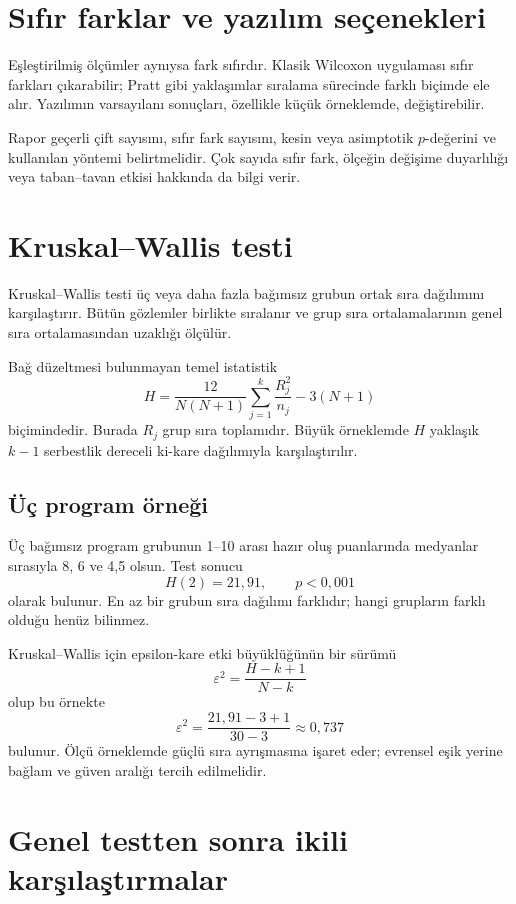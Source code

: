 \section{Sıfır farklar ve yazılım seçenekleri}

Eşleştirilmiş ölçümler aynıysa fark sıfırdır. Klasik Wilcoxon uygulaması sıfır
farkları çıkarabilir; Pratt gibi yaklaşımlar sıralama sürecinde farklı biçimde
ele alır. Yazılımın varsayılanı sonuçları, özellikle küçük örneklemde,
değiştirebilir.

Rapor geçerli çift sayısını, sıfır fark sayısını, kesin veya asimptotik
$p$-değerini ve kullanılan yöntemi belirtmelidir. Çok sayıda sıfır fark,
ölçeğin değişime duyarlılığı veya taban--tavan etkisi hakkında da bilgi verir.

\section{Kruskal--Wallis testi}

Kruskal--Wallis testi üç veya daha fazla bağımsız grubun ortak sıra
dağılımını karşılaştırır. Bütün gözlemler birlikte sıralanır ve grup sıra
ortalamalarının genel sıra ortalamasından uzaklığı ölçülür.

Bağ düzeltmesi bulunmayan temel istatistik
\[
H=\frac{12}{N(N+1)}
\sum_{j=1}^k\frac{R_j^2}{n_j}-3(N+1)
\]
biçimindedir. Burada $R_j$ grup sıra toplamıdır. Büyük örneklemde $H$ yaklaşık
$k-1$ serbestlik dereceli ki-kare dağılımıyla karşılaştırılır.

\subsection{Üç program örneği}

Üç bağımsız program grubunun 1--10 arası hazır oluş puanlarında medyanlar
sırasıyla 8, 6 ve 4,5 olsun. Test sonucu
\[
H(2)=21{,}91,
\qquad p<0{,}001
\]
olarak bulunur. En az bir grubun sıra dağılımı farklıdır; hangi grupların
farklı olduğu henüz bilinmez.

Kruskal--Wallis için epsilon-kare etki büyüklüğünün bir sürümü
\[
\varepsilon^2=\frac{H-k+1}{N-k}
\]
olup bu örnekte
\[
\varepsilon^2
=\frac{21{,}91-3+1}{30-3}
\approx0{,}737
\]
bulunur. Ölçü örneklemde güçlü sıra ayrışmasına işaret eder; evrensel eşik
yerine bağlam ve güven aralığı tercih edilmelidir.

\section{Genel testten sonra ikili karşılaştırmalar}

